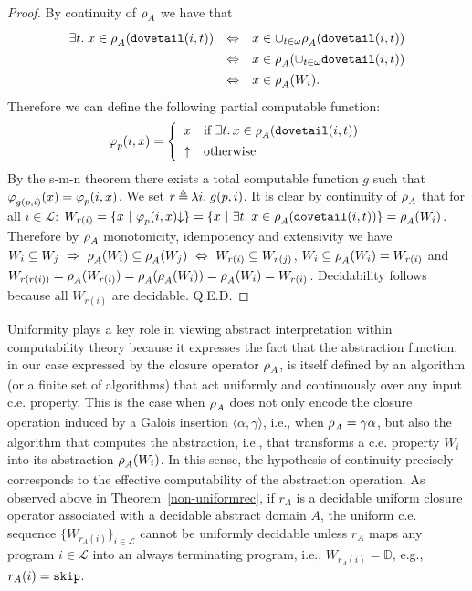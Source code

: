 \documentclass[runningheads]{llncs}
\def\ok#1{\mbox{\raisebox{0ex}[1ex][1ex]{$#1$}}}
\def\re{c.e.}
\newcommand{\myqed}{\textsc{Q.E.D.}}
\def\dovetl{{\tt dovetail}}
\newcommand{\ccL}{\mathscr{L}}
\newcommand{\Domain}{\mathbb{D}}
\newcommand{\pfunction}[3]{\ok{\varphi^{#2\, #3}_{#1}}}
\newcommand{\auco}[2]{\ok{\rho^{#1}_{#2}}}
\newcommand{\Ra}{\Rightarrow}
\newcommand{\ud}{\ok{\:\triangleq\:}}
\def\ok#1{\mbox{\raisebox{0ex}[1ex][1ex]{$#1$}}}
\def\cAA{\ensuremath{A}}
\newcommand{\sset}[2]{\{#1  ~|~ #2\}}
\def\tuple#1{\langle #1 \rangle}
\begin{document}
\begin{proof}
    By continuity of $\auco{}{\cAA}$ we have that 
    \[
    \begin{array}{lll}
    \exists t.\; x\in\auco{}{\cAA}(\dovetl(i,t)) &\Leftrightarrow& x\in\cup_{t\in\omega}\auco{}{\cAA}(\dovetl(i,t))\\[1ex]
    &\Leftrightarrow& x\in\auco{}{\cAA}(\cup_{t\in\omega}\dovetl(i,t))\\[1ex]
    &\Leftrightarrow& x\in\auco{}{\cAA}(W_i).
    \end{array}
    \]
    Therefore we can define the following partial computable function:
    \[
    \pfunction{p}{}{}(i,x)=\left\{
    \begin{array}{cl}
       x &\mbox{if $\exists t.\, x\in\auco{}{\cAA}(\dovetl(i,t))$}\\[1ex]
       \uparrow & \mbox{otherwise}
    \end{array}\right .
    \]
    By the s-m-n theorem there exists a total computable function $g$ such that $\ok{\pfunction{g(p,i)}{}{}(x)=\pfunction{p}{}{}(i,x)}$. We set $\ok{r\ud\lambda i.\; g(p,i)}$. It is clear by continuity of $\auco{}{\cAA}$ that for all $i\in\ccL$: $W_{r(i)}=\sset{x}{\pfunction{p}{}{}(i,x){\downarrow}}=\sset{x}{\exists t.\; x\in\auco{}{\cAA}(\dovetl(i,t))}=\auco{}{\cAA}(W_i)$. Therefore by $\auco{}{\cAA}$ monotonicity, idempotency and extensivity we have $W_i\subseteq W_j~\Ra~\auco{}{\cAA}(W_i)\subseteq \auco{}{\cAA}(W_j)~\Leftrightarrow~W_{r(i)}\subseteq W_{r(j)}$, $W_i\subseteq \auco{}{\cAA}(W_i)=W_{r(i)}$ and 
    $W_{r(r(i))}=\auco{}{\cAA}(W_{r(i)})=\auco{}{\cAA}(\auco{}{\cAA}(W_{i}))=\auco{}{\cAA}(W_{i})=W_{r(i)}$.
    Decidability follows because all $W_{r(i)}$ are decidable. \myqed
\end{proof}

Uniformity plays a key role in viewing abstract interpretation within computability theory  because it expresses the fact that the abstraction function, in our case expressed by the closure operator $\auco{}{A}$, is itself defined by an algorithm (or a finite set of algorithms) that act uniformly and continuously over any input {\re} property. This is the case when $\auco{}{A}$ does not only encode the closure operation induced by a Galois insertion $\tuple{\alpha,\gamma}$, i.e., when $\auco{}{A}=\gamma\alpha$, but also the algorithm that computes the abstraction, i.e., that transforms a {\re} property $W_i$ into its abstraction $\auco{}{A}(W_i)$. In this sense, the hypothesis of continuity precisely corresponds to the effective computability of the abstraction operation. As observed above in Theorem~\ref{non-uniformrec}, if $r_{\cAA}$ is a decidable uniform closure operator associated with a decidable abstract domain $\cAA$, the uniform {\re} sequence $\{W_{r_{\cAA}(i)}\}_{i\in\ccL}$ cannot be uniformly decidable unless $r_{\cAA}$ maps any program $i\in\ccL$ into an always terminating program, i.e., $W_{r_{\cAA}(i)}=\Domain$, e.g., $r_{\cAA}(i)={\tt skip}$.
\end{document}
